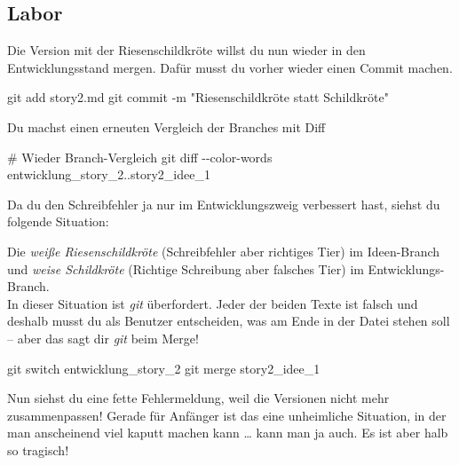 \documentclass[
  letterpaper,
  DIV=11]{scrreprt}
\newenvironment{Shaded}{\begin{snugshade}}{\end{snugshade}}
\newcommand{\AttributeTok}[1]{\textcolor[rgb]{0.40,0.45,0.13}{#1}}
\newcommand{\CommentTok}[1]{\textcolor[rgb]{0.37,0.37,0.37}{#1}}
\newcommand{\FunctionTok}[1]{\textcolor[rgb]{0.28,0.35,0.67}{#1}}
\newcommand{\NormalTok}[1]{\textcolor[rgb]{0.00,0.23,0.31}{#1}}
\newcommand{\StringTok}[1]{\textcolor[rgb]{0.13,0.47,0.30}{#1}}
\newcommand{\git}{\textit{git}\xspace}
\begin{document}
\subsection{Labor}\label{labor-3}

Die Version mit der Riesenschildkröte willst du nun wieder in den
Entwicklungsstand mergen. Dafür musst du vorher wieder einen Commit
machen.

\begin{Shaded}
\begin{Highlighting}[]
\FunctionTok{git}\NormalTok{ add story2.md }
\FunctionTok{git}\NormalTok{ commit }\AttributeTok{{-}m} \StringTok{"Riesenschildkröte statt Schildkröte"}
\end{Highlighting}
\end{Shaded}

Du machst einen erneuten Vergleich der Branches mit Diff

\begin{Shaded}
\begin{Highlighting}[]
\CommentTok{\# Wieder Branch{-}Vergleich }
\FunctionTok{git}\NormalTok{ diff }\AttributeTok{{-}{-}color{-}words}\NormalTok{ entwicklung\_story\_2..story2\_idee\_1}
\end{Highlighting}
\end{Shaded}

Da du den Schreibfehler ja nur im Entwicklungszweig verbessert hast,
siehst du folgende Situation:

Die \emph{weiße Riesenschildkröte} (Schreibfehler aber richtiges Tier)
im Ideen-Branch und \emph{weise Schildkröte} (Richtige Schreibung aber
falsches Tier) im Entwicklungs-Branch.\\
In dieser Situation ist \git überfordert. Jeder der beiden Texte ist
falsch und deshalb musst du als Benutzer entscheiden, was am Ende in der
Datei stehen soll -- aber das sagt dir \git  beim Merge!

\begin{Shaded}
\begin{Highlighting}[]
\FunctionTok{git}\NormalTok{ switch entwicklung\_story\_2}
\FunctionTok{git}\NormalTok{ merge story2\_idee\_1}
\end{Highlighting}
\end{Shaded}

Nun siehst du eine fette Fehlermeldung, weil die Versionen nicht mehr
zusammenpassen! Gerade für Anfänger ist das eine unheimliche Situation,
in der man anscheinend viel kaputt machen kann \ldots{} kann man ja
auch. Es ist aber halb so tragisch!
\end{document}
